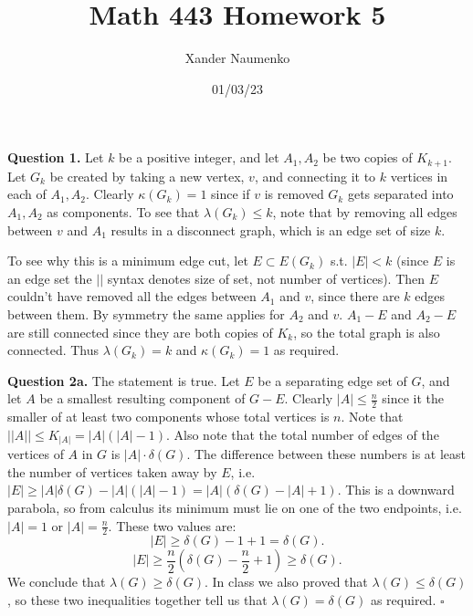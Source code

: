 \documentclass[letterpaper, reqno,11pt]{article}
\begin{document}
\title{Math 443 Homework 5}
\date{01/03/23}
\author{Xander Naumenko}
\maketitle

{\medskip\noindent\bf Question 1.} Let $k$ be a positive integer, and let $A_1,A_2$ be two copies of $K_{k+1}$. Let $G_k$ be created by taking a new vertex, $v$, and connecting it to $k$ vertices in each of $A_1,A_2$. Clearly $\kappa(G_k)=1$ since if $v$ is removed $G_k$ gets separated into $A_1,A_2$ as components. To see that $\lambda(G_k)\leq k$, note that by removing all edges between $v$ and $A_1$ results in a disconnect graph, which is an edge set of size $k$. 

To see why this is a minimum edge cut, let $E\subset E(G_k)$ s.t. $|E|<k$ (since $E$ is an edge set the $\left|  \right| $ syntax denotes size of set, not number of vertices). Then $E$ couldn't have removed all the edges between $A_1$ and $v$, since there are $k$ edges between them. By symmetry the same applies for $A_2$ and $v$. $A_1-E$ and $A_2-E$ are still connected since they are both copies of $K_k$, so the total graph is also connected. Thus $\lambda(G_k)=k$ and $\kappa(G_k)=1$ as required. 

{\medskip\noindent\bf Question 2a.} The statement is true. Let $E$ be a separating edge set of $G$, and let $A$ be a smallest resulting component of $G-E$. Clearly $|A|\leq \frac{n}{2}$ since it the smaller of at least two components whose total vertices is $n$. Note that $| |A| |\leq K_{|A|}=|A|(|A|-1)$. Also note that the total number of edges of the vertices of $A$ in $G$ is $|A|\cdot \delta(G)$. The difference between these numbers is at least the number of vertices taken away by $E$, i.e. $|E|\geq |A| \delta(G)-|A|(|A|-1)=|A|\left( \delta(G)-|A|+1 \right) $. This is a downward parabola, so from calculus its minimum must lie on one of the two endpoints, i.e. $|A|=1$ or $|A|=\frac{n}{2}$. These two values are: 
\[
|E|\geq \delta(G)-1+1=\delta(G)
.\]
\[
|E|\geq \frac{n}{2}(\delta(G)-\frac{n}{2}+1)\geq \delta(G)
.\]
We conclude that $\lambda(G)\geq \delta(G)$. In class we also proved that $\lambda(G)\leq \delta(G)$, so these two inequalities together tell us that $\lambda(G)=\delta(G)$ as required. $\square$
\end{document}
